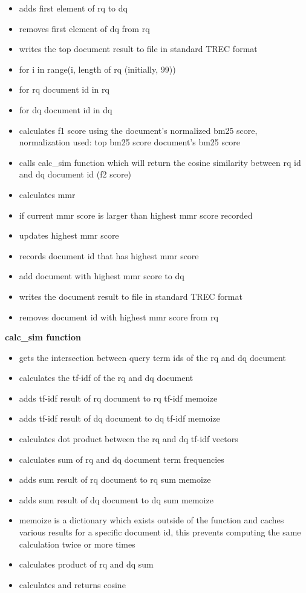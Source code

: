 \documentclass{article} %
\begin{document}
\begin{itemize}
    \item adds first element of rq to dq
    \item removes first element of dq from rq
    \item writes the top document result to file in standard TREC format
    \item for i in range(i, length of rq (initially, 99))
    \item for rq document id in rq
    \item for dq document id in dq
    \item calculates f1 score using the document's normalized bm25 score, normalization used: top bm25 score \/ document's bm25 score
    \item calls calc\_sim function which will return the cosine similarity between rq id and dq document id (f2 score)
    \item calculates mmr
    \item if current mmr score is larger than highest mmr score recorded
    \item updates highest mmr score
    \item records document id that has highest mmr score
    \item add document with highest mmr score to dq
    \item writes the document result to file in standard TREC format
    \item removes document id with highest mmr score from rq
\end{itemize}

\textbf{calc\_sim function}

\begin{itemize}
    \item gets the intersection between query term ids of the rq and dq document
    \item calculates the tf-idf of the rq and dq document
    \item adds tf-idf result of rq document to rq tf-idf memoize
    \item adds tf-idf result of dq document to dq tf-idf memoize
    \item calculates dot product between the rq and dq tf-idf vectors
    \item calculates sum of rq and dq document term frequencies
    \item adds sum result of rq document to rq sum memoize
    \item adds sum result of dq document to dq sum memoize
    \item memoize is a dictionary which exists outside of the function and caches various results for a specific document id, this prevents computing the same calculation twice or more times
    \item calculates product of rq and dq sum
    \item calculates and returns cosine
\end{itemize}
\end{document}
